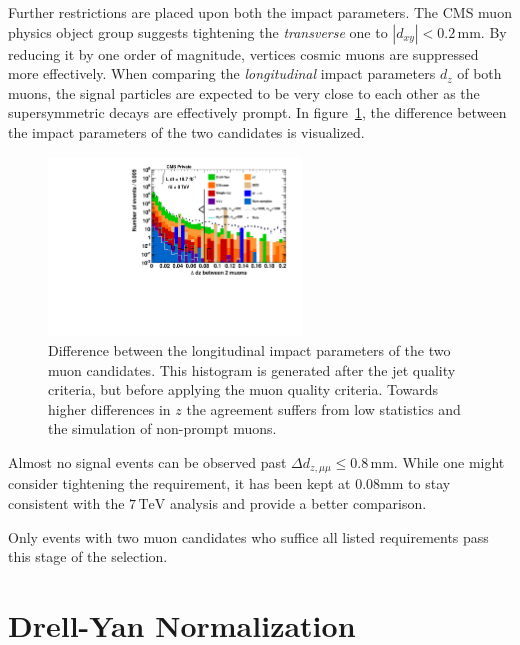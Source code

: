 Further restrictions are placed upon both the impact parameters. The CMS muon physics object group suggests tightening the \textit{transverse} one to $|d_{xy}| < 0.2\,\text{mm}$. By reducing it by one order of magnitude, vertices cosmic muons are suppressed more effectively. When comparing the \textit{longitudinal} impact parameters $d_z$ of both muons, the signal particles are expected to be very close to each other as the supersymmetric decays are effectively prompt. In figure~\ref{fig:deltadz}, the difference between the impact parameters of the two candidates is visualized.

\begin{figure}[ht!]
  \centering
    \includegraphics[width=0.6\textwidth]{plots/dz_mumu.pdf}
  \caption{Difference between the longitudinal impact parameters of the two muon candidates. This histogram is generated after the jet quality criteria, but before applying the muon quality criteria. Towards higher differences in $z$ the agreement suffers from low statistics and the simulation of non-prompt muons.}
  \label{fig:deltadz}
\end{figure}

\noindent Almost no signal events can be observed past $\Delta d_{z, \mu\mu} \leq 0.8\,\text{mm}$. While one might consider tightening the requirement, it has been kept at $0.08\text{mm}$ to stay consistent with the $7\,\text{TeV}$ analysis and provide a better comparison.

Only events with two muon candidates who suffice all listed requirements pass this stage of the selection.



\section{Drell-Yan Normalization}
\label{sec:scaling}

